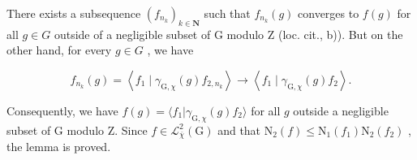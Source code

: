 There exists a subsequence \((f_{n_{k}})_{k\in\mathbf{N}}\) such that \(f_{n_{k}}(g)\) converges to \(f(g)\) for all \(g\in G\) outside of a negligible subset of G modulo Z (loc. cit., b)). But on the other hand, for every \(g\in G\) , we have

\[
f _ {n _ {k}} (g) = \left\langle f _ {1} \mid \gamma_ {\mathrm{G}, \chi} (g) f _ {2, n _ {k}} \right\rangle\rightarrow \left\langle f _ {1} \mid \gamma_ {\mathrm{G}, \chi} (g) f _ {2} \right\rangle .
\]

Consequently, we have \(f(g) = \langle f_1 | \gamma_{\mathrm{G},\chi}(g)f_2 \rangle\) for all \(g\) outside a negligible subset of G modulo Z. Since \(f \in \mathcal{L}_{\overline{\chi}}^2(\mathrm{G})\) and that \(\mathrm{N}_2(f) \leqslant \mathrm{N}_1(f_1)\mathrm{N}_2(f_2)\) , the lemma is proved.

